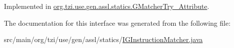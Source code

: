 Implemented in \hyperlink{classorg_1_1tzi_1_1use_1_1gen_1_1assl_1_1statics_1_1_g_matcher_try___attribute_ab1a6515ddb5cd367440ba290084a605b}{org.\-tzi.\-use.\-gen.\-assl.\-statics.\-G\-Matcher\-Try\-\_\-\-Attribute}.



The documentation for this interface was generated from the following file\-:\begin{DoxyCompactItemize}
\item 
src/main/org/tzi/use/gen/assl/statics/\hyperlink{_i_g_instruction_matcher_8java}{I\-G\-Instruction\-Matcher.\-java}\end{DoxyCompactItemize}
